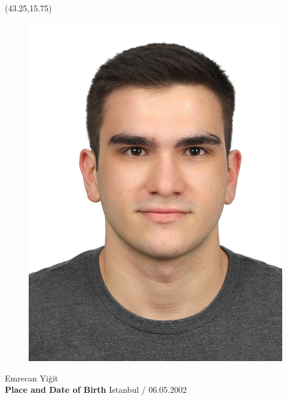 \vspace*{10mm}
\setlength{\TPHorizModule}{10pt}
\setlength{\TPVertModule}{10pt}
\begin{textblock}{1}(43.25,15.75) %
	\begin{figure}[p]
		\includegraphics[scale=0.3,keepaspectratio=true]{cv-photo/emre.jpg}
	\end{figure}	
\end{textblock}
\vspace*{20mm}
\textbf{\makebox[1.6cm]{\hfill \textbf{:}}}\hspace{0.225em} Emrecan Yiğit \\ %

\textbf{Place and Date of Birth\makebox[0.735cm]{\hfill \textbf{:}}}\hspace{0.225em} Istanbul / 06.05.2002  \\ %

